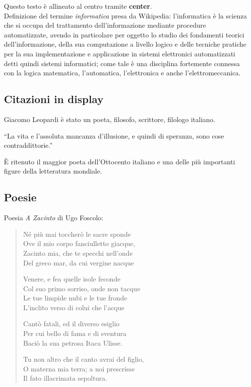\documentclass[a4paper,12pt,oneside]{book}
\theoremstyle{plain}
\begin{document}
	\begin{center}
		Questo testo è allineato al centro tramite \textbf{center}.\\
		Definizione del termine \textit{informatica} presa da Wikipedia: l'informatica è la scienza che si occupa del trattamento dell'informazione mediante procedure automatizzate, avendo in particolare per oggetto lo studio dei fondamenti teorici dell'informazione, della sua computazione a livello logico e delle tecniche pratiche per la sua implementazione e applicazione in sistemi elettronici automatizzati detti quindi sistemi informatici; come tale è una disciplina fortemente connessa con la logica matematica, l'automatica, l'elettronica e anche l'elettromeccanica.
	\end{center}
	
	
	\subsection{Citazioni in display}
	Giacomo Leopardi è stato un poeta, filosofo, scrittore, filologo italiano.
	\begin{quoting}
		``La vita e l'assoluta mancanza d'illusione, e quindi di speranza, sono cose contraddittorie.''
	\end{quoting}
	È ritenuto il maggior poeta dell'Ottocento italiano e una delle più importanti figure della letteratura mondiale.
	
	
	\subsection{Poesie}
	Poesia \textit{A Zacinto} di Ugo Foscolo:
	\begin{verse}
		Né più mai toccherò le sacre sponde\\
		Ove il mio corpo fanciulletto giacque,\\
		Zacinto mia, che te specchi nell'onde\\
		Del greco mar, da cui vergine nacque
		
		Venere, e fea quelle isole feconde\\
		Col suo primo sorriso, onde non tacque\\
		Le tue limpide nubi e le tue fronde\\
		L’inclito verso di colui che l'acque
		
		Cantò fatali, ed il diverso esiglio\\
		Per cui bello di fama e di sventura\\
		Baciò la sua petrosa Itaca Ulisse.
		
		Tu non altro che il canto avrai del figlio,\\
		O materna mia terra; a noi prescrisse\\
		Il fato illacrimata sepoltura.
	\end{verse}
	
\end{document}
